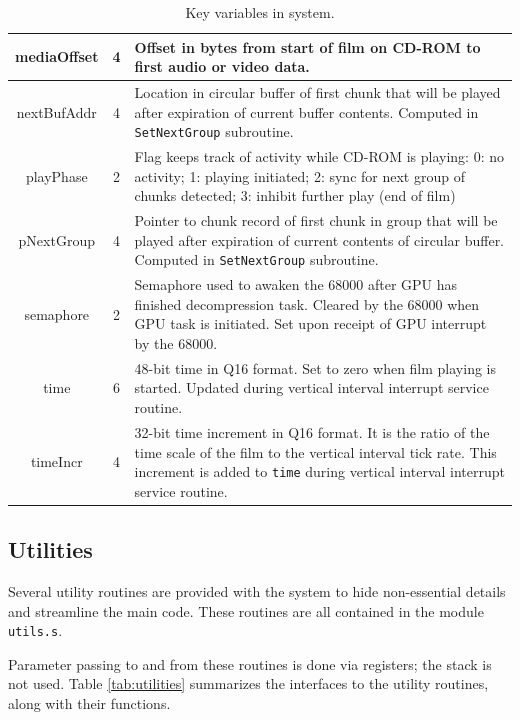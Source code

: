 \documentclass[12pt,letterpaper,twoside]{article}
\begin{document}
\begin{table}[h]
\begin{tabular}{|c|c|p{10cm}|}
\hline
mediaOffset & 4 & Offset in bytes from start of film on CD-ROM to first audio or video data. \\
\hline
nextBufAddr & 4 & Location in circular buffer of first chunk that will be played after expiration of current buffer contents. Computed in \texttt{SetNextGroup} subroutine. \\
\hline
playPhase & 2 & Flag keeps track of activity while CD-ROM is playing: 0: no activity; 1: playing initiated; 2: sync for next group of chunks detected; 3: inhibit further play (end of film) \\
\hline
pNextGroup & 4 & Pointer to chunk record of first chunk in group that will be played after expiration of current contents of circular buffer. Computed in \texttt{SetNextGroup} subroutine. \\
\hline
semaphore & 2 & Semaphore used to awaken the 68000 after GPU has finished decompression task. Cleared by the 68000 when GPU task is initiated. Set upon receipt of GPU interrupt by the 68000. \\
\hline
time & 6 & 48-bit time in Q16 format. Set to zero when film playing is started. Updated during vertical interval interrupt service routine. \\
\hline
timeIncr & 4 & 32-bit time increment in Q16 format. It is the ratio of the time scale of the film to the vertical interval tick rate. This increment is added to \texttt{time} during vertical interval interrupt service routine. \\
\hline
\end{tabular}
\caption{Key variables in system.}
\label{tab:keyvar}
\end{table}
\FloatBarrier

\subsection{Utilities}
Several utility routines are provided with the system to hide non-essential details and streamline the main code. These routines are all contained in the module \texttt{utils.s}.

Parameter passing to and from these routines is done via registers; the stack is not used. Table \ref{tab:utilities} summarizes the interfaces to the utility routines, along with their functions.
\end{document}
